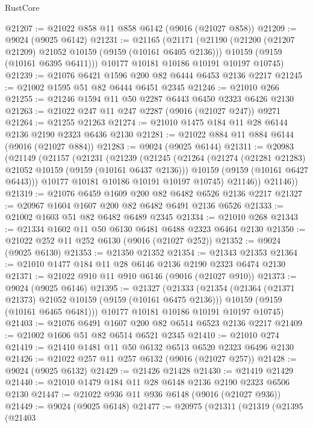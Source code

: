 \begin{lexlean}{RustCore}
\begin{coremodule}
@21207 := @21022 @858 @11 @858 @6142 (@9016 (@21027 @858))
@21209 := @9024 (@9025 @6142)
@21231 := @21165
    (@21171
      (@21190
        (@21200 (@21207 @21209) @21052 @10159 (@9159 (@10161 @6405 @2136)))
        @10159
        (@9159 (@10161 @6395 @6411)))
      @10177
      @10181
      @10186
      @10191
      @10197
      @10745)
@21239 := @21076 @6421 @1596 @200 @82 @6444 @6453 @2136 @2217
@21245 := @21002 @1595 @51 @82 @6444 @6451 @2345
@21246 := @21010 @266
@21255 := @21246 @1594 @11 @50 @2287 @6443 @6450 @2323 @6426 @2130
@21263 := @21022 @247 @11 @247 @2287 (@9016 (@21027 @247)) @9271
@21264 := @21255 @21263
@21274 := @21010 @1475 @184 @11 @28 @6144 @2136 @2190 @2323 @6436 @2130
@21281 := @21022 @884 @11 @884 @6144 (@9016 (@21027 @884))
@21283 := @9024 (@9025 @6144)
@21311 := @20983
    (@21149
      (@21157
        (@21231
          (@21239
            (@21245
              (@21264
                (@21274 (@21281 @21283) @21052 @10159 (@9159 (@10161 @6437 @2136)))
                @10159
                (@9159 (@10161 @6427 @6443)))
              @10177
              @10181
              @10186
              @10191
              @10197
              @10745)
            @21146))
        @21146))
@21319 := @21076 @6459 @1609 @200 @82 @6482 @6526 @2136 @2217
@21327 := @20967 @1604 @1607 @200 @82 @6482 @6491 @2136 @6526
@21333 := @21002 @1603 @51 @82 @6482 @6489 @2345
@21334 := @21010 @268
@21343 := @21334 @1602 @11 @50 @6130 @6481 @6488 @2323 @6464 @2130
@21350 := @21022 @252 @11 @252 @6130 (@9016 (@21027 @252))
@21352 := @9024 (@9025 @6130)
@21353 := @21350 @21352
@21354 := @21343 @21353
@21364 := @21010 @1477 @184 @11 @28 @6146 @2136 @2190 @2323 @6474 @2130
@21371 := @21022 @910 @11 @910 @6146 (@9016 (@21027 @910))
@21373 := @9024 (@9025 @6146)
@21395 := @21327
    (@21333
      (@21354
        (@21364 (@21371 @21373) @21052 @10159 (@9159 (@10161 @6475 @2136)))
        @10159
        (@9159 (@10161 @6465 @6481)))
      @10177
      @10181
      @10186
      @10191
      @10197
      @10745)
@21403 := @21076 @6491 @1607 @200 @82 @6514 @6523 @2136 @2217
@21409 := @21002 @1606 @51 @82 @6514 @6521 @2345
@21410 := @21010 @274
@21419 := @21410 @1481 @11 @50 @6132 @6513 @6520 @2323 @6496 @2130
@21426 := @21022 @257 @11 @257 @6132 (@9016 (@21027 @257))
@21428 := @9024 (@9025 @6132)
@21429 := @21426 @21428
@21430 := @21419 @21429
@21440 := @21010 @1479 @184 @11 @28 @6148 @2136 @2190 @2323 @6506 @2130
@21447 := @21022 @936 @11 @936 @6148 (@9016 (@21027 @936))
@21449 := @9024 (@9025 @6148)
@21477 := @20975
    (@21311
      (@21319
        (@21395
          (@21403

\end{coremodule}
\end{lexlean}
